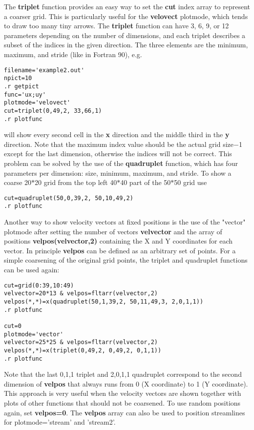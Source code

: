    The {\bf triplet} function provides an easy way to set the {\bf cut} 
   index array to represent a coarser grid. This is particularly useful
   for the {\bf velovect} plotmode, which tends to draw too many tiny arrows.
   The {\bf triplet} function can have 3, 6, 9, or 12 parameters depending on 
   the number of dimensions, and each triplet describes a subset of the 
   indices in the given direction. The three elements are the 
   minimum, maximum, and stride (like in Fortran 90), e.g. 
\begin{verbatim}
filename='example2.out'
npict=10
.r getpict
func='ux;uy'
plotmode='velovect'
cut=triplet(0,49,2, 33,66,1)
.r plotfunc
\end{verbatim}
   will show every second cell in the {\bf x} direction and the middle third 
   in the {\bf y} direction. Note that the maximum index value should be
   the actual grid size$-$1 except for the last dimension, otherwise the 
   indices will not be correct. This problem can be solved by the use of the 
   {\bf quadruplet} function, which has four parameters per dimension:
   size, minimum, maximum, and stride. To show a coarse 20$*$20 grid 
   from the top left 40$*$40 part of the 50$*$50 grid use
\begin{verbatim}
cut=quadruplet(50,0,39,2, 50,10,49,2)
.r plotfunc
\end{verbatim}
   Another way to show velocity vectors at fixed positions is the use of 
   the "vector" plotmode after setting the number of vectors {\bf velvector} 
   and the array of positions {\bf velpos(velvector,2)} containing the 
   X and Y coordinates for each vector. In principle {\bf velpos} can
   be defined as an arbitrary set of points.
   For a simple coarsening of the original grid points, the triplet and 
   quadruplet functions can be used again:
\begin{verbatim}
cut=grid(0:39,10:49)
velvector=20*13 & velpos=fltarr(velvector,2)
velpos(*,*)=x(quadruplet(50,1,39,2, 50,11,49,3, 2,0,1,1))
.r plotfunc

cut=0
plotmode='vector'
velvector=25*25 & velpos=fltarr(velvector,2)
velpos(*,*)=x(triplet(0,49,2, 0,49,2, 0,1,1))
.r plotfunc
\end{verbatim}
   Note that the last 0,1,1 triplet and 2,0,1,1 quadruplet correspond to
   the second dimension of {\bf velpos} that always runs from 
   0 (X coordinate) to 1 (Y coordinate). This approach is very useful when 
   the velocity vectors are shown together with plots of other functions 
   that should not be coarsened. To use random positions again, 
   set {\bf velpos=0}.
   The {\bf velpos} array can also be used to position streamlines for 
   plotmode='stream' and 'stream2'.



